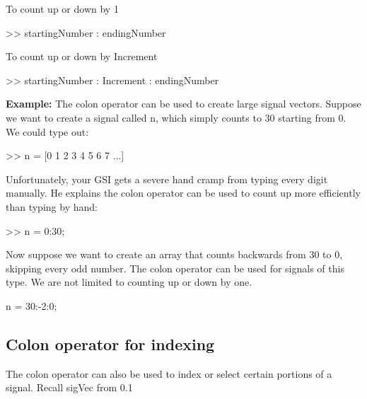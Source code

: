 \documentclass[11pt]{article}
\begin{document}
\begin{center}

To count up or down by 1      

>> startingNumber : endingNumber


\end{center} 

\vspace{4mm}
\begin{center}


To count up or down by Increment

>> startingNumber : Increment : endingNumber

\end{center} 


\vspace{4mm}
\textbf{Example:} The colon operator can be used to create large signal vectors. Suppose we want to create a signal called n, which simply counts to 30 starting from 0. We could type out:

\begin{center}
>> n = [0 1 2 3 4 5 6 7 ...]
\end{center}

\vspace{4mm}

Unfortunately, your GSI gets a severe hand cramp from typing every digit manually. He explains the colon operator can be used to count up more efficiently than typing by hand:

\begin{center}

>> n = 0:30;

\end{center}

\vspace{4mm}

Now suppose we want to create an array that counts backwards from 30 to 0, skipping every odd number. The colon operator can be used for signals of this type. We are not limited to counting up or down by one.

\begin{center}

n = 30:-2:0;

\end{center}

\subsection{Colon operator for indexing}
The colon operator can also be used to index or select certain portions of a signal. Recall sigVec from 0.1
\end{document}
